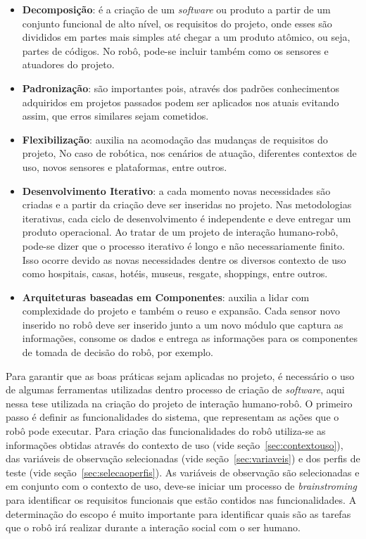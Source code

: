 \begin{itemize}
    \item \textbf{Decomposição}: é a criação de um \emph{software} ou produto a partir de um conjunto funcional de alto nível, os requisitos do projeto, onde esses são divididos em partes mais simples até chegar a um produto atômico, ou seja, partes de códigos. No robô, pode-se incluir também como os sensores e atuadores do projeto.
    \item \textbf{Padronização}: são importantes pois, através dos padrões conhecimentos adquiridos em projetos passados podem ser aplicados nos atuais evitando assim, que erros similares sejam cometidos.
    \item \textbf{Flexibilização}: auxilia na acomodação das mudanças de requisitos do projeto, No caso de robótica, nos cenários de atuação, diferentes contextos de uso, novos sensores e plataformas, entre outros.
    \item \textbf{Desenvolvimento Iterativo}: a cada momento novas necessidades são criadas e a partir da criação deve ser inseridas no projeto. Nas metodologias iterativas, cada ciclo de desenvolvimento é independente e deve entregar um produto operacional. Ao tratar de um projeto de interação humano-robô, pode-se dizer que o processo iterativo é longo e não necessariamente finito. Isso ocorre devido as novas necessidades dentre os diversos contexto de uso como hospitais, casas, hotéis, museus, resgate, shoppings, entre outros.
    \item \textbf{Arquiteturas baseadas em Componentes}: auxilia a lidar com complexidade do projeto e também o reuso e expansão. Cada sensor novo inserido no robô deve ser inserido junto a um novo módulo que captura as informações, consome os dados e entrega as informações para os componentes de tomada de decisão do robô, por exemplo.
\end{itemize}

Para garantir que as boas práticas sejam aplicadas no projeto, é necessário o uso de algumas ferramentas utilizadas dentro processo de criação de \emph{software}, aqui nessa tese utilizada na criação do projeto de interação humano-robô. O primeiro passo é definir as funcionalidades do sistema, que representam as ações que o robô pode executar. Para criação das funcionalidades do robô utiliza-se as informações obtidas através do contexto de uso (vide seção~\ref{sec:contextouso}), das variáveis de observação selecionadas (vide seção~\ref{sec:variaveis}) e dos perfis de teste (vide seção~\ref{sec:selecaoperfis}). As variáveis de observação são selecionadas e em conjunto com o contexto de uso, deve-se iniciar um processo de \textit{brainstroming} para identificar os requisitos funcionais que estão contidos nas funcionalidades. A determinação do escopo é muito importante para identificar quais são as tarefas que o robô irá realizar durante a interação social com o ser humano. 

